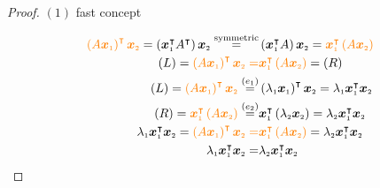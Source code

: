 \documentclass[
]{book}
\theoremstyle{definition}
\theoremstyle{definition}
\theoremstyle{definition}
\theoremstyle{definition}
\theoremstyle{remark}
\begin{document}
\begin{proof}

\(\left(1\right)\) fast concept

\[
\begin{aligned}
{\color{orange}\left(A\boldsymbol{x}_{{\scriptscriptstyle 1}}\right)^{\intercal}\boldsymbol{x}_{{\scriptscriptstyle 2}}}=\left(\boldsymbol{x}_{{\scriptscriptstyle 1}}^{\intercal}A^{\intercal}\right)\boldsymbol{x}_{{\scriptscriptstyle 2}}\overset{\text{symmetric}}{=} & \left(\boldsymbol{x}_{{\scriptscriptstyle 1}}^{\intercal}A\right)\boldsymbol{x}_{{\scriptscriptstyle 2}}={\color{orange}\boldsymbol{x}_{{\scriptscriptstyle 1}}^{\intercal}\left(A\boldsymbol{x}_{{\scriptscriptstyle 2}}\right)}\\
\left(L\right)={\color{orange}\left(A\boldsymbol{x}_{{\scriptscriptstyle 1}}\right)^{\intercal}\boldsymbol{x}_{{\scriptscriptstyle 2}}=} & {\color{orange}\boldsymbol{x}_{{\scriptscriptstyle 1}}^{\intercal}\left(A\boldsymbol{x}_{{\scriptscriptstyle 2}}\right)}=\left(R\right)\\
\left(L\right)={\color{orange}\left(A\boldsymbol{x}_{{\scriptscriptstyle 1}}\right)^{\intercal}\boldsymbol{x}_{{\scriptscriptstyle 2}}}\overset{\left(e_{{\scriptscriptstyle 1}}\right)}{=} & \left(\lambda_{{\scriptscriptstyle 1}}\boldsymbol{x}_{{\scriptscriptstyle 1}}\right)^{\intercal}\boldsymbol{x}_{{\scriptscriptstyle 2}}=\lambda_{{\scriptscriptstyle 1}}\boldsymbol{x}_{{\scriptscriptstyle 1}}^{\intercal}\boldsymbol{x}_{{\scriptscriptstyle 2}}\\
\left(R\right)={\color{orange}\boldsymbol{x}_{{\scriptscriptstyle 1}}^{\intercal}\left(A\boldsymbol{x}_{{\scriptscriptstyle 2}}\right)}\overset{\left(e_{{\scriptscriptstyle 2}}\right)}{=} & \boldsymbol{x}_{{\scriptscriptstyle 1}}^{\intercal}\left(\lambda_{{\scriptscriptstyle 2}}\boldsymbol{x}_{{\scriptscriptstyle 2}}\right)=\lambda_{{\scriptscriptstyle 2}}\boldsymbol{x}_{{\scriptscriptstyle 1}}^{\intercal}\boldsymbol{x}_{{\scriptscriptstyle 2}}\\
\lambda_{{\scriptscriptstyle 1}}\boldsymbol{x}_{{\scriptscriptstyle 1}}^{\intercal}\boldsymbol{x}_{{\scriptscriptstyle 2}}={\color{orange}\left(A\boldsymbol{x}_{{\scriptscriptstyle 1}}\right)^{\intercal}\boldsymbol{x}_{{\scriptscriptstyle 2}}=} & {\color{orange}\boldsymbol{x}_{{\scriptscriptstyle 1}}^{\intercal}\left(A\boldsymbol{x}_{{\scriptscriptstyle 2}}\right)}=\lambda_{{\scriptscriptstyle 2}}\boldsymbol{x}_{{\scriptscriptstyle 1}}^{\intercal}\boldsymbol{x}_{{\scriptscriptstyle 2}}\\
\lambda_{{\scriptscriptstyle 1}}\boldsymbol{x}_{{\scriptscriptstyle 1}}^{\intercal}\boldsymbol{x}_{{\scriptscriptstyle 2}}= & \lambda_{{\scriptscriptstyle 2}}\boldsymbol{x}_{{\scriptscriptstyle 1}}^{\intercal}\boldsymbol{x}_{{\scriptscriptstyle 2}}
\end{aligned}
\]

\end{proof}
\end{document}
